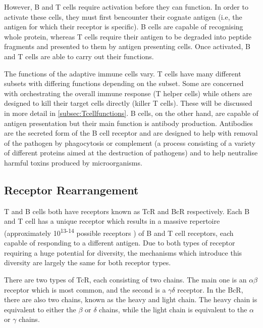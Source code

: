 However, B and T cells require activation before they can function.
In order to activate these cells, they must first bencounter their cognate antigen (i.e, the antigen for which their receptor is specific).
B cells are capable of recognising whole protein, whereas T cells require their antigen to be degraded into peptide fragments and presented to them by antigen presenting cells.
Once activated, B and T cells are able to carry out their functions.

The functions of the adaptive immune cells vary.
T cells have many different subsets with differing functions depending on the subset.
Some are concerned with orchestrating the overall immune response (T helper cells) while others are designed to kill their target cells directly (killer T cells).
These will be discussed in more detail in \cref{subsec:Tcellfunctions}.
B cells, on the other hand, are capable of antigen presentation but their main function is antibody production.
Antibodies are the secreted form of the B cell receptor and are designed to help with removal of the pathogen by phagocytosis or complement (a process consisting of a variety of different proteins aimed at the destruction of pathogens) and to help neutralise harmful toxins produced by microorganisms.

\subsection{Receptor Rearrangement}
\label{subsec:receptorrearrangement}

T and B cells both have receptors known as TcR and BcR respectively.
Each B and T cell has a unique receptor which results in a massive repertoire (approximately 10\textsuperscript{13-14} possible receptors \citep{KubyImmunology}) of B and T cell receptors, each capable of responding to a different antigen.
Due to both types of receptor requiring a huge potential for diversity, the mechanisms which introduce this diversity are largely the same for both receptor types.


There are two types of TcR, each consisting of two chains.
The main one is an $\alpha\beta$ receptor which is most common, and the second is a $\gamma\delta$ receptor.
In the BcR, there are also two chains, known as the heavy and light chain.
The heavy chain is equivalent to either the $\beta$ or $\delta$ chains, while the light chain is equivalent to the $\alpha$ or $\gamma$ chains.

